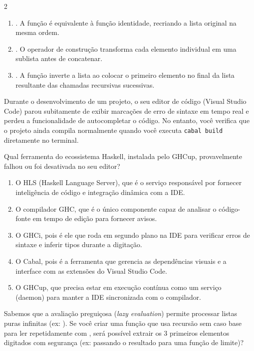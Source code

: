 \documentclass[a4paper,10pt,brazil]{article}
\begin{document}
\begin{multicols}{2}
\begin{enumerate}
  \item \haskellinline{[1, 2, 3]}. A função é equivalente à função identidade, recriando a lista original na mesma ordem.

  \item \haskellinline{[[1], [2], [3]]}. O operador de construção transforma cada elemento individual em uma sublista antes de concatenar.

  \item \haskellinline{[3, 2, 1]}. A função inverte a lista ao colocar o primeiro elemento no final da lista resultante das chamadas recursivas sucessivas.


\end{enumerate}

Durante o desenvolvimento de um projeto, o seu editor de código (Visual Studio Code) parou subitamente de exibir marcações de erro de sintaxe em tempo real e perdeu a funcionalidade de autocompletar o código. No entanto, você verifica que o projeto ainda compila normalmente quando você executa \texttt{cabal build} diretamente no terminal. 

Qual ferramenta do ecossistema Haskell, instalada pelo GHCup, provavelmente falhou ou foi desativada no seu editor?

\begin{enumerate}
  \item O HLS (Haskell Language Server), que é o serviço responsável por fornecer inteligência de código e integração dinâmica com a IDE.

  \item O compilador GHC, que é o único componente capaz de analisar o código-fonte em tempo de edição para fornecer avisos.

  \item O GHCi, pois é ele que roda em segundo plano na IDE para verificar erros de sintaxe e inferir tipos durante a digitação.

  \item O Cabal, pois é a ferramenta que gerencia as dependências visuais e a interface com as extensões do Visual Studio Code.

  \item O GHCup, que precisa estar em execução contínua como um serviço (daemon) para manter a IDE sincronizada com o compilador.


\end{enumerate}

Sabemos que a avaliação preguiçosa (\emph{lazy evaluation}) permite processar listas puras infinitas (ex: ). 
Se você criar uma função  que usa recursão sem caso base para ler repetidamente com , será possível extrair os 3 primeiros elementos digitados com segurança (ex: passando o resultado para uma função de limite)?


\end{multicols}
\end{document}
